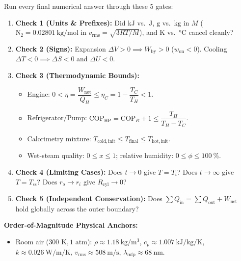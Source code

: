 \begin{twocol}[0.51]
\begin{shortcut}
Run every final numerical answer through these 5 gates:
\begin{enumerate}
  \item \textbf{Check 1 (Units \& Prefixes):} Did $\si{\kilo\joule}$ vs.\ $\si{\joule}$, $\si{\gram}$ vs.\ $\si{\kilogram}$ in $M$ ($\mathrm{N_2} = \SI{0.02801}{\kilogram\per\mole}$ in $v_{\mathrm{rms}} = \sqrt{3RT/M}$), and $\si{\kelvin}$ vs.\ $\si{\celsius}$ cancel cleanly?
  \item \textbf{Check 2 (Signs):} Expansion $\Delta V > 0 \implies W_{\mathrm{by}} > 0$ ($w_{\mathrm{on}} < 0$). Cooling $\Delta T < 0 \implies \Delta S < 0$ and $\Delta U < 0$.
  \item \textbf{Check 3 (Thermodynamic Bounds):}
  \begin{itemize}
    \item Engine: $0 < \eta = \dfrac{W_{\mathrm{net}}}{Q_H} \le \eta_C = 1 - \dfrac{T_C}{T_H} < 1$.
    \item Refrigerator/Pump: $\mathrm{COP}_{\mathrm{HP}} = \mathrm{COP}_R + 1 \le \dfrac{T_H}{T_H - T_C}$.
    \item Calorimetry mixture: $T_{\mathrm{cold,init}} \le T_{\mathrm{final}} \le T_{\mathrm{hot,init}}$.
    \item Wet-steam quality: $0 \le x \le 1$; relative humidity: $0 \le \phi \le \SI{100}{\percent}$.
  \end{itemize}
  \item \textbf{Check 4 (Limiting Cases):} Does $t \to 0$ give $T = T_i$? Does $t \to \infty$ give $T = T_{\mathrm{ss}}$? Does $r_o \to r_i$ give $R_{\mathrm{cyl}} \to 0$?
  \item \textbf{Check 5 (Independent Conservation):} Does $\sum Q_{\mathrm{in}} = \sum Q_{\mathrm{out}} + W_{\mathrm{net}}$ hold globally across the outer boundary?
\end{enumerate}
\end{shortcut}
\nextcol[0.465]
\begin{formulacard}
\textbf{Order-of-Magnitude Physical Anchors:}
\begin{itemize}
  \item Room air ($300\text{ K}, 1\text{ atm}$): $\rho \approx \SI{1.18}{\kilogram\per\cubic\meter}$, $c_p \approx \SI{1.007}{\kilo\joule\per\kilogram\per\kelvin}$, $k \approx \SI{0.026}{\watt\per\meter\per\kelvin}$, $v_{\mathrm{rms}} \approx \SI{508}{\meter\per\second}$, $\lambda_{\mathrm{mfp}} \approx \SI{68}{\nano\meter}$.

\end{itemize}
\end{formulacard}
\end{twocol}
